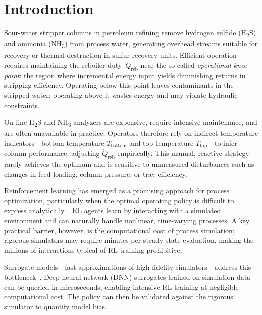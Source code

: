 \documentclass[journal,10pt,twocolumn]{IEEEtran}
\begin{document}
\section{Introduction}
\label{sec:intro}

Sour-water stripper columns in petroleum refining remove hydrogen sulfide (H\textsubscript{2}S) and ammonia (NH\textsubscript{3}) from process water, generating overhead streams suitable for recovery or thermal destruction in sulfur-recovery units. Efficient operation requires maintaining the reboiler duty~$\dot{Q}_\text{reb}$ near the so-called \emph{operational knee-point}: the region where incremental energy input yields diminishing returns in stripping efficiency. Operating below this point leaves contaminants in the stripped water; operating above it wastes energy and may violate hydraulic constraints.

On-line H\textsubscript{2}S and NH\textsubscript{3} analyzers are expensive, require intensive maintenance, and are often unavailable in practice. Operators therefore rely on indirect temperature indicators---bottom temperature $T_\text{bottom}$ and top temperature $T_\text{top}$---to infer column performance, adjusting $\dot{Q}_\text{reb}$ empirically. This manual, reactive strategy rarely achieves the optimum and is sensitive to unmeasured disturbances such as changes in feed loading, column pressure, or tray efficiency.

Reinforcement learning has emerged as a promising approach for process optimization, particularly when the optimal operating policy is difficult to express analytically~\cite{mnih2015human,lillicrap2015continuous,schulman2017proximal}. RL agents learn by interacting with a simulated environment and can naturally handle nonlinear, time-varying processes. A key practical barrier, however, is the computational cost of process simulation; rigorous simulators may require minutes per steady-state evaluation, making the millions of interactions typical of RL training prohibitive.

Surrogate models---fast approximations of high-fidelity simulators---address this bottleneck~\cite{bhosekar2018advances,kim2020surrogate}. Deep neural network (DNN) surrogates trained on simulation data can be queried in microseconds, enabling intensive RL training at negligible computational cost. The policy can then be validated against the rigorous simulator to quantify model bias.
\end{document}
